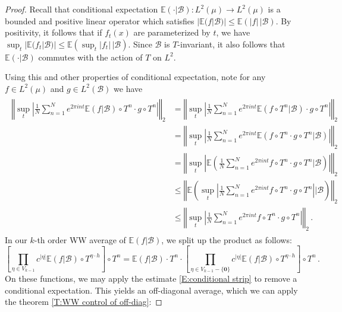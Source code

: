 \documentclass[11pt, oneside]{amsart}   	%
\newcommand{\E}{\mathbb{E}}
\newcommand{\1}{\mathbbm{1}}
\theoremstyle{definition}
\begin{document}
\begin{proof}
Recall that conditional expectation $\mathbb{E}(\cdot|\mathcal{B}):L^2(\mu) \to L^2(\mu)$ is a bounded and positive linear operator which satisfies $|\mathbb{E}(f|\mathcal{B})| \leq \mathbb{E}(|f| \, |\mathcal{B})$. By positivity, it follows that if $f_t(x)$ are parameterized by $t$, we have $\sup_t |\mathbb{E}(f_t|\mathcal{B})| \leq \mathbb{E}(\sup_t|f_t| \, |\mathcal{B})$. Since $\mathcal{B}$ is $T$-invariant, it also follows that $\mathbb{E}(\cdot|\mathcal{B})$ commutes with the action of $T$ on $L^2$. 

Using this and other properties of conditional expectation, note for any $f\in L^2(\mu)$ and $g\in L^2(\mathcal{B})$ we have
\begin{align}\label{E:conditional strip}
\begin{split}
\left\Vert \sup_t \left| \frac{1}{N} \sum_{n=1}^N e^{2\pi i n t} \mathbb{E}(f|\mathcal{B}) \circ T^n \cdot g \circ T^n\right|\right\Vert_2 &=\left\Vert \sup_t \left| \frac{1}{N} \sum_{n=1}^N e^{2\pi i n t}\mathbb{E}(f \circ T^n|\mathcal{B}) \cdot g \circ T^n\right|\right\Vert_2 \\
&=\left\Vert \sup_t \left| \frac{1}{N} \sum_{n=1}^N e^{2\pi i n t}\mathbb{E}(f \circ T^n \cdot g \circ T^n|\mathcal{B})\right|\right\Vert_2 \\
&=\left\Vert \sup_t \left|\mathbb{E}\left( \frac{1}{N} \sum_{n=1}^N e^{2\pi i n t}f \circ T^n \cdot g \circ T^n\Big|\mathcal{B}\right)\right|\right\Vert_2 \\
&\leq \left\Vert \mathbb{E}\left( \sup_t \left| \frac{1}{N} \sum_{n=1}^N e^{2\pi i n t}f \circ T^n \cdot g \circ T^n\right|\Big|\mathcal{B}\right)\right\Vert_2 \\
&\leq \left\Vert \sup_t \left| \frac{1}{N}\sum_{n=1}^N  e^{2\pi i n t}f \circ T^n \cdot g \circ T^n\right|\right\Vert_2 \, .
\end{split}
\end{align}
In our $k$-th order WW average of $\E(f|\mathcal{B})$, we split up the product as follows:
$$\left[\prod_{\eta\in V_{k-1}} c^{|\eta|} \mathbb{E}(f|\mathcal{B}) \circ T^{\eta\cdot h}\right]\circ T^n = \E(f|\mathcal{B})\cdot T^n \cdot \left[\prod_{\eta\in V_{k-1} - \{\mathbf{0}\}} c^{|\eta|} \mathbb{E}(f|\mathcal{B}) \circ T^{\eta\cdot h}\right]\circ T^n \, .$$
On these functions, we may apply the estimate \ref{E:conditional strip} to remove a conditional expectation. This yields an off-diagonal average, which we can apply the theorem \ref{T:WW control of off-diag}:


\end{proof}
\end{document}
